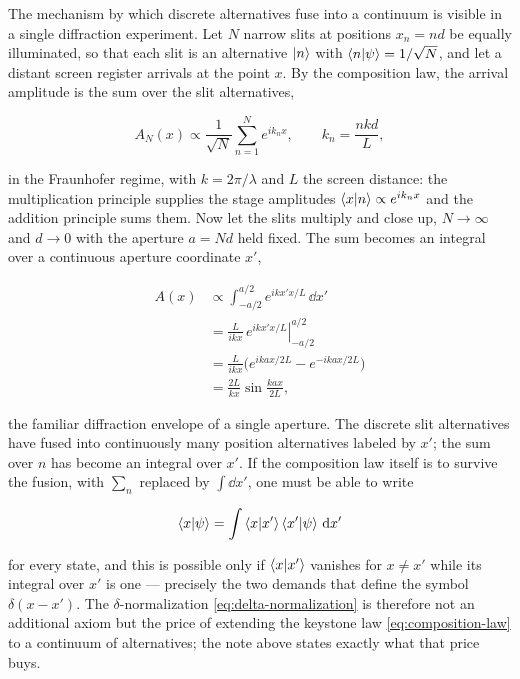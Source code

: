 The mechanism by which discrete alternatives fuse into a continuum is visible in a single diffraction experiment. Let $N$ narrow slits at positions $x_n=nd$ be equally illuminated, so that each slit is an alternative $\ket{n}$ with $\braket{n|\psi}=1/\sqrt{N}$, and let a distant screen register arrivals at the point $x$. By the composition law, the arrival amplitude is the sum over the slit alternatives,
\begin{linenomath}
    \begin{equation}
        A_N(x)\propto\frac{1}{\sqrt{N}}\sum_{n=1}^{N} e^{ik_n x},
        \qquad
        k_n=\frac{nkd}{L},
        \label{eq:nslit}
    \end{equation}
\end{linenomath}
in the Fraunhofer regime, with $k=2\pi/\lambda$ and $L$ the screen distance: the multiplication principle supplies the stage amplitudes $\braket{x|n}\propto e^{ik_n x}$ and the addition principle sums them. Now let the slits multiply and close up, $N\to\infty$ and $d\to 0$ with the aperture $a=Nd$ held fixed. The sum becomes an integral over a continuous aperture coordinate $x'$,
\begin{linenomath}
    \begin{equation}
        \begin{aligned}
            A(x)&\propto\int_{-a/2}^{a/2} e^{ikx'x/L}\,\dd x' \\
            &=\left.\frac{L}{ikx}\,e^{ikx'x/L}\right|_{-a/2}^{a/2} \\
            &=\frac{L}{ikx}\bigl(e^{ikax/2L}-e^{-ikax/2L}\bigr) \\
            &=\frac{2L}{kx}\sin\frac{kax}{2L},
        \end{aligned}
        \label{eq:aperture}
    \end{equation}
\end{linenomath}
the familiar diffraction envelope of a single aperture. The discrete slit alternatives have fused into continuously many position alternatives labeled by $x'$; the sum over $n$ has become an integral over $x'$. If the composition law itself is to survive the fusion, with $\sum_n$ replaced by $\int\dd x'$, one must be able to write
\begin{linenomath}
    \begin{equation}
        \braket{x|\psi}=\int\braket{x|x'}\braket{x'|\psi}\,\mathrm{d} x'
        \label{eq:continuum-composition}
    \end{equation}
\end{linenomath}
for every state, and this is possible only if $\braket{x|x'}$ vanishes for $x\neq x'$ while its integral over $x'$ is one --- precisely the two demands that define the symbol $\delta(x-x')$. The $\delta$-normalization \eqref{eq:delta-normalization} is therefore not an additional axiom but the price of extending the keystone law \eqref{eq:composition-law} to a continuum of alternatives; the note above states exactly what that price buys.

